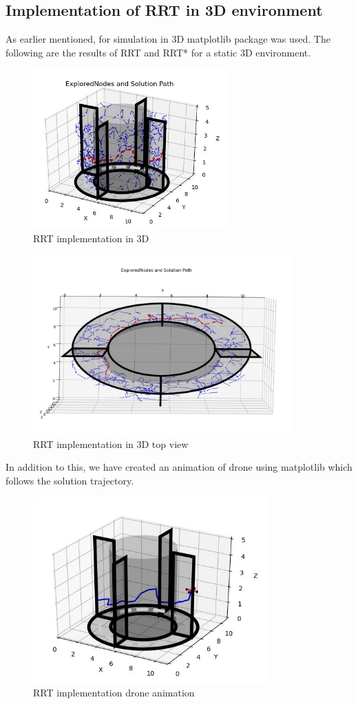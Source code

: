 \documentclass{IEEEtran}
\begin{document}
\subsection{\textbf{Implementation of RRT in 3D environment}}
As earlier mentioned, for simulation in 3D matplotlib package was used. The following are the results of RRT and RRT* for a static 3D environment.
\begin{figure}[h]
    \includegraphics[width=7.5cm]{rrt3d}
    \caption{RRT implementation in 3D}
    \label{fig:RRT implementation in 3D}
\end{figure} 
\newpage
\begin{figure}[h]
    \centering
    \includegraphics[width=10cm]{rrt3dtop}
    \caption{RRT implementation in 3D top view}
    \label{fig:RRT implementation in 3D top view}
\end{figure}
In addition to this, we have created an animation of drone using matplotlib which follows the solution trajectory.
 \begin{figure}[h]
    \centering
    \includegraphics[width=9cm]{rrt3ddrone}
    \caption{RRT implementation drone animation}
    \label{fig:RRT implementation drone animation}
\end{figure}
\end{document}
